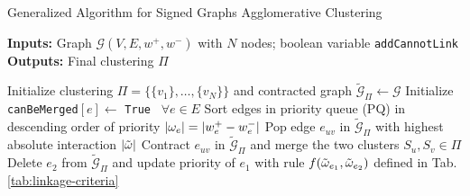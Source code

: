 \begin{figure}
\begin{minipage}{0.49\textwidth}
    \end{minipage}
\end{figure}

\begin{algorithm}[t]
  \caption{Generalized Algorithm for Signed Graphs Agglomerative Clustering}
   \hspace*{\algorithmicindent} \textbf{Inputs:} Graph $\mathcal{G}(V,E,w^+,w^-)$ with $N$ nodes; boolean variable {\color{blue}\texttt{addCannotLink}}  \\
  \hspace*{\algorithmicindent} \textbf{Outputs:} Final clustering $\Pi$\\
  \hspace*{\algorithmicindent} 
  \begin{algorithmic}[1]
      \State Initialize clustering $\Pi=\{\{v_1\}, \ldots, \{v_N\}\}$ and contracted graph $\tilde{\mathcal{G}}_\Pi \gets \mathcal{G}$
      \State Initialize \texttt{canBeMerged}$[e] \gets$ \texttt{True} $\,\,\, \forall e\in E$
      \State Sort edges in priority queue (PQ) in descending order of priority $|\omega_e|=|w^+_e - w^-_e|$ 
      \State
        \State Pop edge $e_{uv}$ in $\tilde{\mathcal{G}}_\Pi$ with highest absolute interaction $|\tilde{\omega}|$
          \State Contract $e_{uv}$ in $\tilde{\mathcal{G}}_\Pi$ and merge the two clusters $S_u,S_v \in \Pi$
            \State Delete $e_2$ from $\tilde{\mathcal{G}}_\Pi$ and update priority of $e_1$ with rule $f(\tilde{\omega}_{e_1},\tilde{\omega}_{e_2})$ defined in Tab. \ref{tab:linkage-criteria} 

\end{algorithmic}
\end{algorithm}
